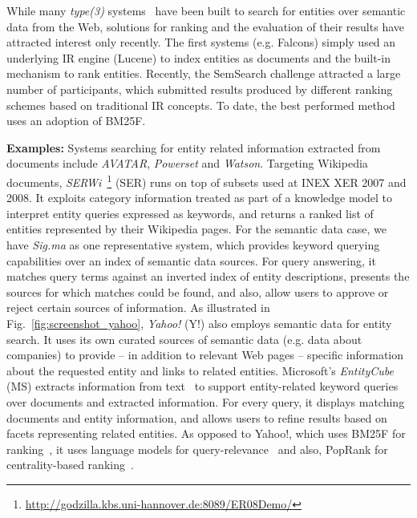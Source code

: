 While many \emph{type(3)} systems~\cite{DBLP:journals/ijswis/ChengQ09,DBLP:journals/ws/HoganHUKPD11,DBLP:journals/ws/TummarelloCCDDD10,DBLP:journals/ws/TranWH09} have been built to search for entities over semantic data from the Web, solutions for ranking and the evaluation of their results have attracted interest only recently. The first systems (e.g. Falcons) simply used an underlying IR engine (Lucene) to index entities as documents and the built-in mechanism to rank entities. Recently, the SemSearch challenge attracted a large number of participants, which submitted results produced by different ranking schemes based on traditional IR concepts. To date, the best performed method~\cite{DBLP:conf/semweb/BlancoMV11} uses an adoption of BM25F. 


\textbf{Examples:}
Systems searching for entity related information extracted from documents include \emph{AVATAR}, \emph{Powerset} and \emph{Watson}. Targeting Wikipedia documents, \emph{SERWi}~\footnote{\url{http://godzilla.kbs.uni-hannover.de:8089/ER08Demo/}} (SER) runs on top of subsets used at INEX XER 2007 and 2008. It exploits category information treated as part of a knowledge model to interpret entity queries expressed as keywords, and returns a ranked list of entities represented by their Wikipedia pages. For the semantic data case, we have \emph{Sig.ma} as one representative system, which provides keyword querying capabilities over an index of semantic data sources. For query answering, it matches query terms against an inverted index of entity descriptions, presents the sources for which matches could be found, and also, allow users to approve or reject certain sources of information. As illustrated in Fig.~\ref{fig:screenshot_yahoo}, \emph{Yahoo!} (Y!) also employs semantic data for entity search. It uses its own curated sources of semantic data (e.g. data about companies) to provide -- in addition to relevant Web pages -- specific information about the requested entity and links to related entities. Microsoft's \emph{EntityCube} (MS) extracts information from text~\cite{DBLP:conf/www/ZhuNLZW09} to support entity-related keyword queries over documents and extracted information. For every query, it displays matching documents and entity information, and allows users to refine results based on facets representing related entities. As opposed to Yahoo!, which uses BM25F for ranking~\cite{DBLP:conf/semweb/BlancoMV11}, it uses language models for query-relevance~\cite{DBLP:conf/www/NieMSWM07} and also, PopRank for centrality-based ranking~\cite{DBLP:conf/www/NieZWM05}. 


